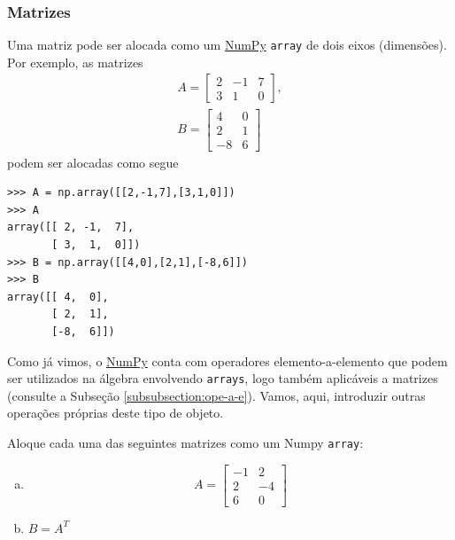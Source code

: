 \documentclass[12pt]{article}
\begin{document}
\subsubsection{Matrizes}

Uma matriz pode ser alocada como um \href{https://numpy.org/}{NumPy} \lstinline+array+ de dois eixos (dimensões). Por exemplo, as matrizes
\begin{gather}
  A =
  \begin{bmatrix}
    2 & -1 & 7\\
    3 & 1 & 0
  \end{bmatrix},\\
  B =
  \begin{bmatrix}
    4 & 0\\
    2 & 1\\
   -8 & 6
  \end{bmatrix}
\end{gather}
podem ser alocadas como segue

\begin{lstlisting}
>>> A = np.array([[2,-1,7],[3,1,0]])
>>> A
array([[ 2, -1,  7],
       [ 3,  1,  0]])
>>> B = np.array([[4,0],[2,1],[-8,6]])
>>> B
array([[ 4,  0],
       [ 2,  1],
       [-8,  6]])
\end{lstlisting}


Como já vimos, o \href{https://numpy.org/}{NumPy} conta com operadores elemento-a-elemento que podem ser utilizados na álgebra envolvendo \lstinline+arrays+, logo também aplicáveis a matrizes (consulte a Subseção \ref{subsubsection:ope-a-e}). Vamos, aqui, introduzir outras operações próprias deste tipo de objeto.

\begin{exr}
  Aloque cada uma das seguintes matrizes como um Numpy \lstinline+array+:
  \begin{enumerate}[a)]
  \item
    \begin{equation}
      A =
      \begin{bmatrix}
        -1 & 2\\
        2 & -4\\
        6 & 0
      \end{bmatrix}
    \end{equation}
  \item $B = A^T$ 
  \end{enumerate}
\end{exr}
\end{document}
